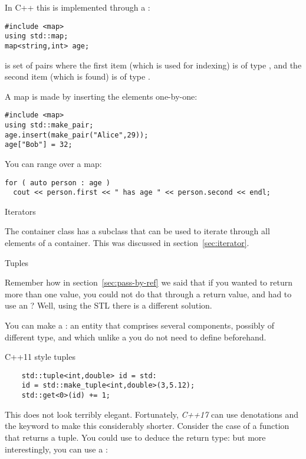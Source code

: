 In C++ this is implemented through a :
\begin{verbatim}
#include <map>
using std::map;
map<string,int> age;
\end{verbatim}
is set of
pairs where the first item (which is used for indexing) is of type
, and the second item (which is found) is of type .

A map is made by inserting the elements one-by-one:
\begin{verbatim}
#include <map>
using std::make_pair;
age.insert(make_pair("Alice",29));
age["Bob"] = 32;
\end{verbatim}

You can range over a map:
\begin{verbatim}
for ( auto person : age )
  cout << person.first << " has age " << person.second << endl;
\end{verbatim}

 {Iterators}

The container class has a subclass  that can be
used to iterate through all elements of a container. This was
discussed in section~\ref{sec:iterator}.

 {Tuples}
\label{sec:tuple}

Remember how in section~\ref{sec:pass-by-ref} we said that if you
wanted to return more than one value, you could not do that through a
return value, and had to use an ?
Well, using the \ac{STL} there is a different solution.

You can make a : an entity that comprises several
components, possibly of different type, and which unlike a
 you do not need to define beforehand.

\lstset{style=reviewcode,language=C++}
\begin{block}{C++11 style tuples}
  \label{sl:tuple11}
  \begin{lstlisting}
    std::tuple<int,double> id = std:
    id = std::make_tuple<int,double>(3,5.12);
    std::get<0>(id) += 1;
  \end{lstlisting}
\end{block}

This does not look terribly elegant. Fortunately,
\emph{C++17} can use denotations and the 
keyword to make this considerably shorter. Consider the case of a
function that returns a tuple. You could use  to deduce the
return type:
%
%
but more interestingly, you can use a
:
%

